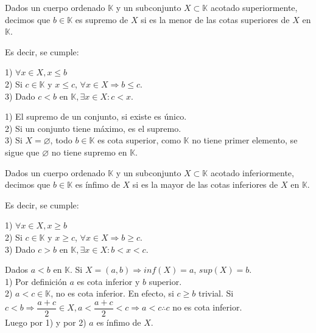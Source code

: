 \begin{definition}
    Dados un cuerpo ordenado $\mathbb{K}$ y un subconjunto $X \subset \mathbb{K}$ acotado superiormente, decimos que $b \in \mathbb{K}$ es supremo de $X$ si es la menor de las cotas superiores de $X$ en $\mathbb{K}$.
\end{definition}

Es decir, se cumple:

1) $\forall x \in X, x \leq b$ \\
2) Si $c \in \mathbb{K}$ y $x \leq c$, $\forall x \in X \Rightarrow b \leq c$. \\
3) Dado $c < b$ en $\mathbb{K}, \exists x \in X : c<x$.

\begin{note}
    1) El supremo de un conjunto, si existe es único. \\
    2) Si un conjunto tiene máximo, es el supremo. \\
    3) Si $X = \varnothing$, todo $b \in \mathbb{K}$ es cota superior, como $\mathbb{K}$ no tiene primer elemento, se sigue que $\varnothing$ no tiene supremo en $\mathbb{K}$.
\end{note}

\begin{definition}
    Dados un cuerpo ordenado $\mathbb{K}$ y un subconjunto $X \subset \mathbb{K}$ acotado inferiormente, decimos que $b \in \mathbb{K}$ es ínfimo de $X$ si es la mayor de las cotas inferiores de $X$ en $\mathbb{K}$.
\end{definition}

Es decir, se cumple:

1) $\forall x \in X, x \geq b$ \\
2) Si $c \in \mathbb{K}$ y $x \geq c$, $\forall x \in X \Rightarrow b \geq c$. \\
3) Dado $c > b$ en $\mathbb{K}, \exists x \in X : b < x < c$.

\begin{eg}
    Dados $a<b$ en $\mathbb{K}$. Si $X=(a,b) \Rightarrow inf(X)=a$, $sup(X)=b$. \\
    1) Por definición $a$ es cota inferior y $b$ superior. \\
    2) $a<c \in \mathbb{K}$, no es cota inferior. En efecto, si $c \geq b$ trivial. Si $c < b \Rightarrow \dfrac{a+c}{2} \in X, a < \dfrac{a+c}{2} < c \Rightarrow a < c \therefore c$ no es cota inferior. \\
    Luego por 1) y por 2) $a$ es ínfimo de $X$.
\end{eg}

